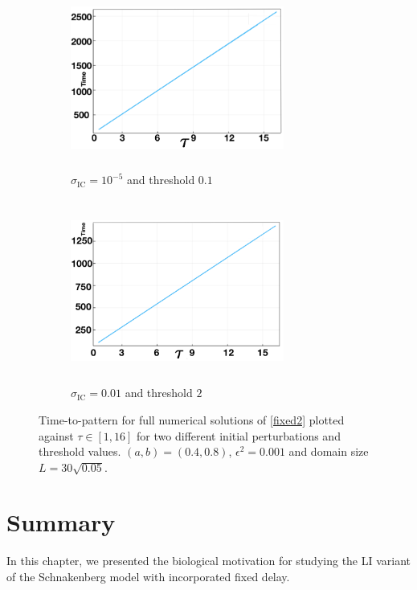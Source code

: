 \begin{figure}[H]
    \centering
    \begin{subfigure}[b]{0.45\textwidth}
        \centering
        \includegraphics[width=7cm,height=6cm]{longlin3.png}
        \caption{$\sigma_{\text{IC}}=10^{-5}$ and threshold $0.1$}
        \label{fig:linperturb2a}
    \end{subfigure}
    \hfill
    \begin{subfigure}[b]{0.45\textwidth}
        \centering
        \includegraphics[width=7cm,height=6cm]{longlin4.png}
        \caption{$\sigma_{\text{IC}}=0.01$ and threshold $2$}
        \label{fig:linperturb2b}
    \end{subfigure}
    \caption{Time-to-pattern for full numerical solutions of \eqref{fixed2} plotted against $\tau\in[1,16]$ for two different initial perturbations and threshold values. $(a,b)=(0.4,0.8)$, $\epsilon^2=0.001$ and domain size $L=30\sqrt{0.05}$.}
    \label{fig:linperturb2}
\end{figure}


\section{Summary}

In this chapter, we presented the biological motivation for studying the LI variant of the Schnakenberg model with incorporated fixed delay.


